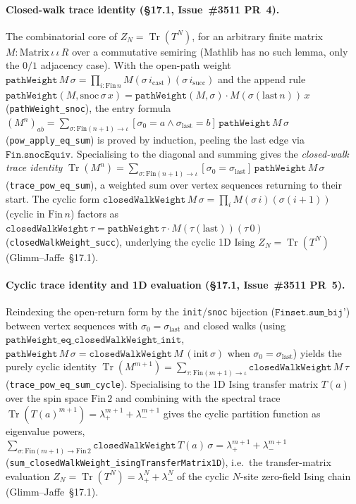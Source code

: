 \documentclass[a4paper,11pt]{article}
\begin{document}
\paragraph{Closed-walk trace identity (\S17.1, Issue~\#3511 PR~4).}
The combinatorial core of $Z_N = \operatorname{Tr}(T^N)$, for an arbitrary finite
matrix $M : \mathrm{Matrix}\,\iota\,\iota\,R$ over a commutative semiring (Mathlib
has no such lemma, only the $0/1$ adjacency case). With the open-path weight
$\texttt{pathWeight}\,M\,\sigma = \prod_{i : \mathrm{Fin}\,n} M(\sigma\,i_{\mathrm{cast}})(\sigma\,i_{\mathrm{succ}})$
and the append rule
$\texttt{pathWeight}(M, \mathrm{snoc}\,\sigma\,x) = \texttt{pathWeight}(M,\sigma)\cdot M(\sigma(\mathrm{last}\,n))\,x$
(\texttt{pathWeight\_snoc}), the entry formula
$(M^n)_{ab} = \sum_{\sigma : \mathrm{Fin}(n{+}1)\to\iota} [\sigma_0 = a \wedge \sigma_{\mathrm{last}} = b]\,\texttt{pathWeight}\,M\,\sigma$
(\texttt{pow\_apply\_eq\_sum}) is proved by induction, peeling the last edge via
$\texttt{Fin.snocEquiv}$. Specialising to the diagonal and summing gives the
\emph{closed-walk trace identity}
$\operatorname{Tr}(M^n) = \sum_{\sigma : \mathrm{Fin}(n{+}1)\to\iota} [\sigma_0 = \sigma_{\mathrm{last}}]\,\texttt{pathWeight}\,M\,\sigma$
(\texttt{trace\_pow\_eq\_sum}), a weighted sum over vertex sequences returning to
their start. The cyclic form
$\texttt{closedWalkWeight}\,M\,\sigma = \prod_{i} M(\sigma\,i)(\sigma(i{+}1))$
(cyclic in $\mathrm{Fin}\,n$) factors as
$\texttt{closedWalkWeight}\,\tau = \texttt{pathWeight}\,\tau \cdot M(\tau(\mathrm{last}))(\tau\,0)$
(\texttt{closedWalkWeight\_succ}), underlying the cyclic 1D Ising
$Z_N = \operatorname{Tr}(T^N)$ (Glimm--Jaffe~\S17.1).

\paragraph{Cyclic trace identity and 1D evaluation (\S17.1, Issue~\#3511 PR~5).}
Reindexing the open-return form by the \texttt{init}/\texttt{snoc} bijection
($\texttt{Finset.sum\_bij'}$) between vertex sequences with $\sigma_0 = \sigma_{\mathrm{last}}$
and closed walks (using $\texttt{pathWeight\_eq\_closedWalkWeight\_init}$,
$\texttt{pathWeight}\,M\,\sigma = \texttt{closedWalkWeight}\,M\,(\mathrm{init}\,\sigma)$
when $\sigma_0 = \sigma_{\mathrm{last}}$) yields the purely cyclic identity
$\operatorname{Tr}(M^{m+1}) = \sum_{\tau : \mathrm{Fin}(m{+}1)\to\iota} \texttt{closedWalkWeight}\,M\,\tau$
(\texttt{trace\_pow\_eq\_sum\_cycle}). Specialising to the 1D Ising transfer
matrix $T(a)$ over the spin space $\mathrm{Fin}\,2$ and combining with the
spectral trace $\operatorname{Tr}(T(a)^{m+1}) = \lambda_+^{m+1} + \lambda_-^{m+1}$
gives the cyclic partition function as eigenvalue powers,
$\sum_{\sigma : \mathrm{Fin}(m{+}1)\to\mathrm{Fin}\,2} \texttt{closedWalkWeight}\,T(a)\,\sigma = \lambda_+^{m+1} + \lambda_-^{m+1}$
(\texttt{sum\_closedWalkWeight\_isingTransferMatrix1D}), i.e.\ the transfer-matrix
evaluation $Z_N = \operatorname{Tr}(T^N) = \lambda_+^N + \lambda_-^N$ of the cyclic
$N$-site zero-field Ising chain (Glimm--Jaffe~\S17.1).
\end{document}
